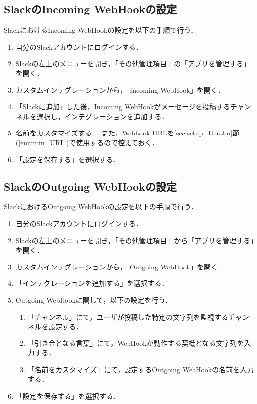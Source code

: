 \documentclass[12pt]{jsarticle}
\begin{document}
\subsection{SlackのIncoming WebHookの設定}\label{sec:Incoming}
SlackにおけるIncoming WebHookの設定を以下の手順で行う．
\begin{enumerate}
\item 自分のSlackアカウントにログインする．
\item Slackの左上のメニューを開き，「その他管理項目」の「アプリを管理する」を開く．
\item カスタムインテグレーションから，「Incoming WebHook」を開く．
\item 「Slackに追加」した後，Incoming WebHookがメーセージを投稿するチャンネルを選択し，インテグレーションを追加する．
\item\label{enum:Heroku_URL} 名前をカスタマイズする．
  また，Webhook URLを\ref{sec:setup_Heroku}節(\ref{enum:in_URL})で使用するので控えておく．
\item 「設定を保存する」を選択する．
\end{enumerate}

\subsection{SlackのOutgoing WebHookの設定}
SlackにおけるOutgoing WebHookの設定を以下の手順で行う．
\begin{enumerate}
\item 自分のSlackアカウントにログインする．
\item Slackの左上のメニューを開き，「その他管理項目」から「アプリを管理する」を開く．
\item カスタムインテグレーションから，「Outgoing WebHook」を開く．
\item 「インテグレーションを追加する」を選択する．
\item Outgoing WebHookに関して，以下の設定を行う．
  \begin{enumerate}
  \item 「チャンネル」にて，ユーザが投稿した特定の文字列を監視するチャンネルを設定する．
  \item 「引き金となる言葉」にて，WebHookが動作する契機となる文字列を入力する．
  \item 「名前をカスタマイズ」にて，設定するOutgoing WebHookの名前を入力する．
  \end{enumerate}
\item 「設定を保存する」を選択する．
\end{enumerate}
\end{document}
